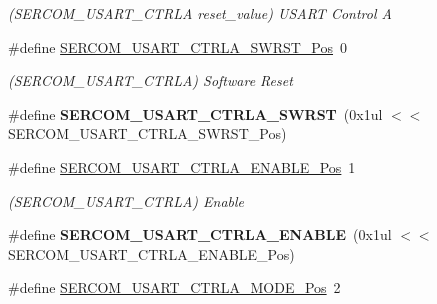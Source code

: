 \begin{DoxyCompactItemize}
\begin{DoxyCompactList}\small\item\em (S\+E\+R\+C\+O\+M\+\_\+\+U\+S\+A\+R\+T\+\_\+\+C\+T\+R\+L\+A reset\+\_\+value) U\+S\+A\+R\+T Control A \end{DoxyCompactList}\item 
\hypertarget{group___s_a_m_l21___s_e_r_c_o_m_ga4e94483b45a4fba80eda7a8b6bd8c89e}{}\#define \hyperlink{group___s_a_m_l21___s_e_r_c_o_m_ga4e94483b45a4fba80eda7a8b6bd8c89e}{S\+E\+R\+C\+O\+M\+\_\+\+U\+S\+A\+R\+T\+\_\+\+C\+T\+R\+L\+A\+\_\+\+S\+W\+R\+S\+T\+\_\+\+Pos}~0\label{group___s_a_m_l21___s_e_r_c_o_m_ga4e94483b45a4fba80eda7a8b6bd8c89e}

\begin{DoxyCompactList}\small\item\em (S\+E\+R\+C\+O\+M\+\_\+\+U\+S\+A\+R\+T\+\_\+\+C\+T\+R\+L\+A) Software Reset \end{DoxyCompactList}\item 
\hypertarget{group___s_a_m_l21___s_e_r_c_o_m_gab923bb0ebc152479174306a96e8c204d}{}\#define {\bfseries S\+E\+R\+C\+O\+M\+\_\+\+U\+S\+A\+R\+T\+\_\+\+C\+T\+R\+L\+A\+\_\+\+S\+W\+R\+S\+T}~(0x1ul $<$$<$ S\+E\+R\+C\+O\+M\+\_\+\+U\+S\+A\+R\+T\+\_\+\+C\+T\+R\+L\+A\+\_\+\+S\+W\+R\+S\+T\+\_\+\+Pos)\label{group___s_a_m_l21___s_e_r_c_o_m_gab923bb0ebc152479174306a96e8c204d}

\item 
\hypertarget{group___s_a_m_l21___s_e_r_c_o_m_ga20ddd5ff4448a7c36b4c4d005efa05ed}{}\#define \hyperlink{group___s_a_m_l21___s_e_r_c_o_m_ga20ddd5ff4448a7c36b4c4d005efa05ed}{S\+E\+R\+C\+O\+M\+\_\+\+U\+S\+A\+R\+T\+\_\+\+C\+T\+R\+L\+A\+\_\+\+E\+N\+A\+B\+L\+E\+\_\+\+Pos}~1\label{group___s_a_m_l21___s_e_r_c_o_m_ga20ddd5ff4448a7c36b4c4d005efa05ed}

\begin{DoxyCompactList}\small\item\em (S\+E\+R\+C\+O\+M\+\_\+\+U\+S\+A\+R\+T\+\_\+\+C\+T\+R\+L\+A) Enable \end{DoxyCompactList}\item 
\hypertarget{group___s_a_m_l21___s_e_r_c_o_m_ga4d89ccd4686664dcdf23442429c1e8a2}{}\#define {\bfseries S\+E\+R\+C\+O\+M\+\_\+\+U\+S\+A\+R\+T\+\_\+\+C\+T\+R\+L\+A\+\_\+\+E\+N\+A\+B\+L\+E}~(0x1ul $<$$<$ S\+E\+R\+C\+O\+M\+\_\+\+U\+S\+A\+R\+T\+\_\+\+C\+T\+R\+L\+A\+\_\+\+E\+N\+A\+B\+L\+E\+\_\+\+Pos)\label{group___s_a_m_l21___s_e_r_c_o_m_ga4d89ccd4686664dcdf23442429c1e8a2}

\item 
\hypertarget{group___s_a_m_l21___s_e_r_c_o_m_ga0796e7296d74a5202c5a9fc61ea9ea3b}{}\#define \hyperlink{group___s_a_m_l21___s_e_r_c_o_m_ga0796e7296d74a5202c5a9fc61ea9ea3b}{S\+E\+R\+C\+O\+M\+\_\+\+U\+S\+A\+R\+T\+\_\+\+C\+T\+R\+L\+A\+\_\+\+M\+O\+D\+E\+\_\+\+Pos}~2\label{group___s_a_m_l21___s_e_r_c_o_m_ga0796e7296d74a5202c5a9fc61ea9ea3b}


\end{DoxyCompactItemize}
